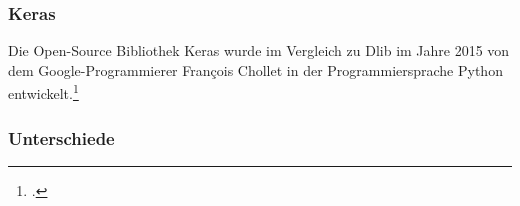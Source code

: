 \documentclass[12pt, a4paper]{scrbook}
\begin{document}
\subsubsection{Keras}
Die Open-Source Bibliothek Keras wurde im Vergleich zu Dlib im Jahre 2015 von dem Google-Programmierer François Chollet in der Programmiersprache Python entwickelt.\footcite[Vgl.]{Keras}


\subsubsection{Unterschiede}


\end{document}
